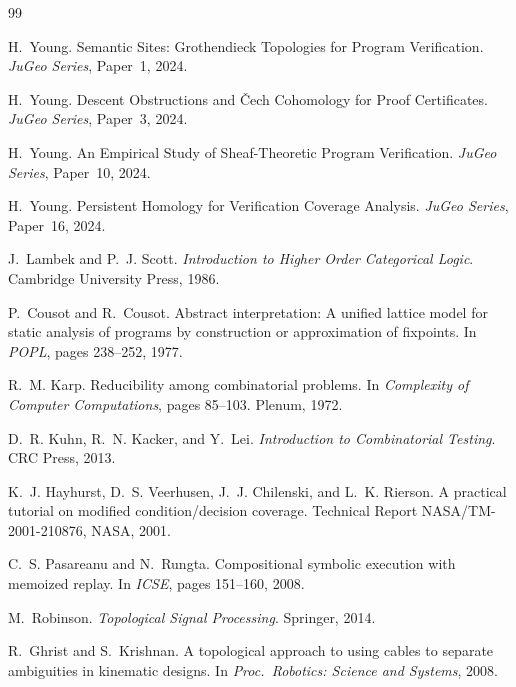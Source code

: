 \documentclass[11pt]{article}
\begin{document}
\begin{thebibliography}{99}

H.~Young.
\newblock Semantic Sites: {G}rothendieck Topologies for Program Verification.
\newblock \emph{JuGeo Series}, Paper~1, 2024.

H.~Young.
\newblock Descent Obstructions and {\v C}ech Cohomology for Proof Certificates.
\newblock \emph{JuGeo Series}, Paper~3, 2024.

H.~Young.
\newblock An Empirical Study of Sheaf-Theoretic Program Verification.
\newblock \emph{JuGeo Series}, Paper~10, 2024.

H.~Young.
\newblock Persistent Homology for Verification Coverage Analysis.
\newblock \emph{JuGeo Series}, Paper~16, 2024.

J.~Lambek and P.~J. Scott.
\newblock \emph{Introduction to Higher Order Categorical Logic}.
\newblock Cambridge University Press, 1986.

P.~Cousot and R.~Cousot.
\newblock Abstract interpretation: A unified lattice model for static analysis
  of programs by construction or approximation of fixpoints.
\newblock In \emph{POPL}, pages 238--252, 1977.

R.~M. Karp.
\newblock Reducibility among combinatorial problems.
\newblock In \emph{Complexity of Computer Computations}, pages 85--103.
  Plenum, 1972.

D.~R. Kuhn, R.~N. Kacker, and Y.~Lei.
\newblock \emph{Introduction to Combinatorial Testing}.
\newblock CRC Press, 2013.

K.~J. Hayhurst, D.~S. Veerhusen, J.~J. Chilenski, and L.~K. Rierson.
\newblock A practical tutorial on modified condition/decision coverage.
\newblock Technical Report NASA/TM-2001-210876, NASA, 2001.

C.~S. Pasareanu and N.~Rungta.
\newblock Compositional symbolic execution with memoized replay.
\newblock In \emph{ICSE}, pages 151--160, 2008.

M.~Robinson.
\newblock \emph{Topological Signal Processing}.
\newblock Springer, 2014.

R.~Ghrist and S.~Krishnan.
\newblock A topological approach to using cables to separate ambiguities in
  kinematic designs.
\newblock In \emph{Proc.\ Robotics: Science and Systems}, 2008.

\end{thebibliography}
\end{document}
